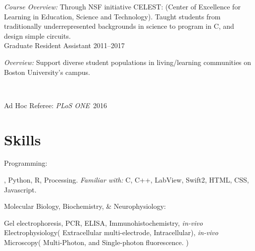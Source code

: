     \textit{Course Overview:} Through NSF initiative CELEST: (Center of Excellence for Learning in Education, Science and Technology). Taught students from traditionally underrepresented backgrounds in science to program in C, and design simple circuits.\\
    
    
Graduate Resident Assistant  \hfill {2011--2017}\

    \textit{Overview:} Support diverse student populations in living/learning communities on Boston University's campus.\

\


Ad Hoc Referee: \textit{PLoS ONE}\  \hfill {2016}
 





\section{Skills}
Programming:
%
\begin{innerlist}
    \item  \Matlab, Python, R, Processing. \textit{Familiar with:} C, C++, LabView, Swift2, HTML, CSS, Javascript.
\end{innerlist}

\halfblankline

Molecular Biology, Biochemistry, \& Neurophysiology:
%
\begin{innerlist}
    \item  Gel electrophoresis, PCR, ELISA, Immunohistochemistry, \textit{in-vivo} Electrophysiology( Extracellular multi-electrode, Intracellular), \textit{in-vivo} Microscopy( Multi-Photon, and Single-photon fluorescence. )
\end{innerlist}

